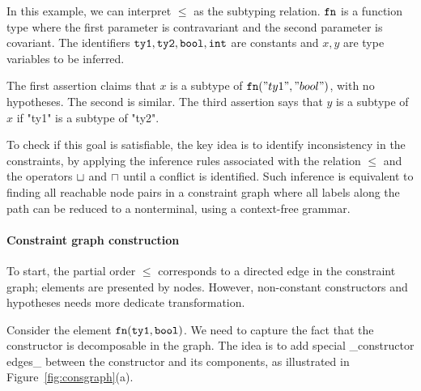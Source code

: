 In this example, we can interpret $\leq$ as the subtyping relation. $\mathtt{fn}$ is
a function type where the first parameter is contravariant and the second
parameter is covariant. The identifiers $\mathtt{ty1}, \mathtt{ty2}, \mathtt{bool},
\mathtt{int}$ are constants and $x, y$ are type variables to be inferred.

The first assertion claims that $x$ is a subtype of $\mathtt{fn} ("ty1",
"bool")$, with no hypotheses. The second is similar.
The third assertion says that $y$ is a subtype of $x$ if "ty1" is
a subtype of "ty2".

To check if this goal is satisfiable, the key idea is to
identify inconsistency in the constraints, by applying the inference
rules associated with the relation $\leq$ and the operators $\sqcup$
and $\sqcap$ until a conflict is identified. Such
inference is equivalent to finding all reachable node pairs in a
constraint graph where all labels along the path can be reduced to
a nonterminal, using a context-free grammar.

\paragraph{Constraint graph construction}
To start, the partial order $\leq$ corresponds to a directed edge in
the constraint graph; elements are presented by nodes. However,
non-constant constructors and hypotheses needs more dedicate
transformation.

Consider the element $\mathtt{fn} (\mathtt{ty1}, \mathtt{bool})$. We need to capture
the fact that the constructor is decomposable in the graph. The idea is to add
special _constructor edges_ between the constructor and its
components, as illustrated in Figure~\ref{fig:consgraph}(a).

